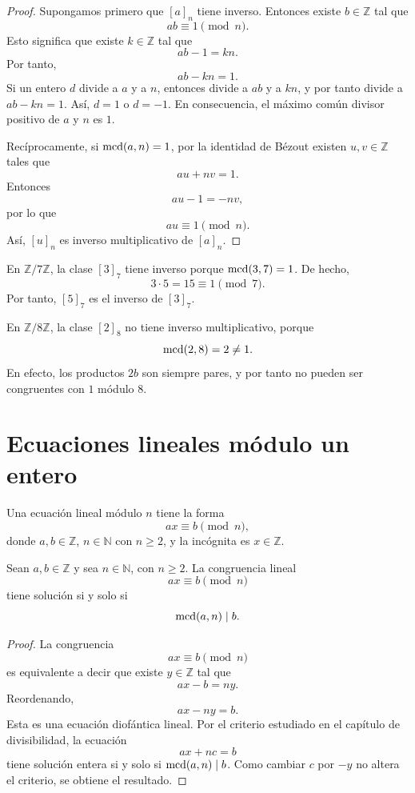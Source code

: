 \begin{proof}
Supongamos primero que \([a]_n\) tiene inverso. Entonces existe \(b\in\mathbb{Z}\) tal que
\[
  ab\equiv 1\pmod n.
\]
Esto significa que existe \(k\in\mathbb{Z}\) tal que
\[
  ab-1=kn.
\]
Por tanto,
\[
  ab-kn=1.
\]
Si un entero \(d\) divide a \(a\) y a \(n\), entonces divide a \(ab\) y a \(kn\), y por tanto divide a \(ab-kn=1\). Así, \(d=1\) o \(d=-1\). En consecuencia, el máximo común divisor positivo de \(a\) y \(n\) es \(1\).

Recíprocamente, si \(\operatorname{mcd}(a,n)=1\), por la identidad de Bézout existen \(u,v\in\mathbb{Z}\) tales que
\[
  au+nv=1.
\]
Entonces
\[
  au-1=-nv,
\]
por lo que
\[
  au\equiv 1\pmod n.
\]
Así, \([u]_n\) es inverso multiplicativo de \([a]_n\).
\end{proof}

\begin{ejemplo}
En \(\mathbb{Z}/7\mathbb{Z}\), la clase \([3]_7\) tiene inverso porque \(\operatorname{mcd}(3,7)=1\). De hecho,
\[
  3\cdot 5=15\equiv 1\pmod 7.
\]
Por tanto, \([5]_7\) es el inverso de \([3]_7\).
\end{ejemplo}

\begin{contraejemplo}
En \(\mathbb{Z}/8\mathbb{Z}\), la clase \({[2]}_8\) no tiene inverso multiplicativo, porque
\[
  \operatorname{mcd}(2,8)=2\neq 1.
\]
En efecto, los productos \(2b\) son siempre pares, y por tanto no pueden ser congruentes con \(1\) módulo \(8\).
\end{contraejemplo}

\section{Ecuaciones lineales módulo un entero}

Una ecuación lineal módulo \(n\) tiene la forma
\[
  ax\equiv b\pmod n,
\]
donde \(a,b\in\mathbb{Z}\), \(n\in\mathbb{N}\) con \(n\geq 2\), y la incógnita es \(x\in\mathbb{Z}\).

\begin{teorema}
Sean \(a,b\in\mathbb{Z}\) y sea \(n\in\mathbb{N}\), con \(n\geq 2\). La congruencia lineal
\[
  ax\equiv b\pmod n
\]
tiene solución si y solo si
\[
  \operatorname{mcd}(a,n)\mid b.
\]
\end{teorema}

\begin{proof}
La congruencia
\[
  ax\equiv b\pmod n
\]
es equivalente a decir que existe \(y\in\mathbb{Z}\) tal que
\[
  ax-b=ny.
\]
Reordenando,
\[
  ax-ny=b.
\]
Esta es una ecuación diofántica lineal. Por el criterio estudiado en el capítulo de divisibilidad, la ecuación
\[
  ax+nc=b
\]
tiene solución entera si y solo si \(\operatorname{mcd}(a,n)\mid b\). Como cambiar \(c\) por \(-y\) no altera el criterio, se obtiene el resultado.
\end{proof}

